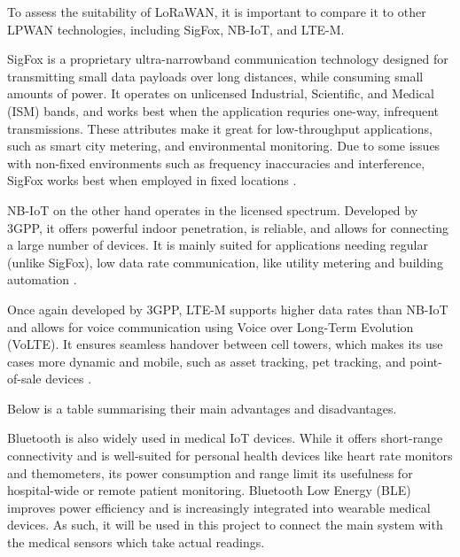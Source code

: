 To assess the suitability of LoRaWAN, it is important to compare it to other LPWAN technologies, including SigFox, NB-IoT, and LTE-M.

SigFox is a proprietary ultra-narrowband communication technology designed for transmitting small data payloads over long distances, while consuming small amounts of power. It operates on unlicensed Industrial, Scientific, and Medical (ISM) bands, and works best when the application requries one-way, infrequent transmissions. These attributes make it great for low-throughput applications, such as smart city metering, and environmental monitoring. Due to some issues with non-fixed environments such as frequency inaccuracies and interference, SigFox works best when employed in fixed locations \cite{sigfox_advantages_disadvantages}.

NB-IoT on the other hand operates in the licensed spectrum. Developed by 3GPP, it offers powerful indoor penetration, is reliable, and allows for connecting a large number of devices. It is mainly suited for applications needing regular (unlike SigFox), low data rate communication, like utility metering and building automation \cite{nbiot_advantages_disadvantages}.

Once again developed by 3GPP, LTE-M supports higher data rates than NB-IoT and allows for voice communication using Voice over Long-Term Evolution (VoLTE). It ensures seamless handover between cell towers, which makes its use cases more dynamic and mobile, such as asset tracking, pet tracking, and point-of-sale devices \cite{ltem_telenor}.

Below is a table summarising their main advantages and disadvantages.



Bluetooth is also widely used in medical IoT devices. While it offers short-range connectivity and is well-suited for personal health devices like heart rate monitors and themometers, its power consumption and range limit its usefulness for hospital-wide or remote patient monitoring. Bluetooth Low Energy (BLE) improves power efficiency and is increasingly integrated into wearable medical devices. As such, it will be used in this project to connect the main system with the medical sensors which take actual readings.

